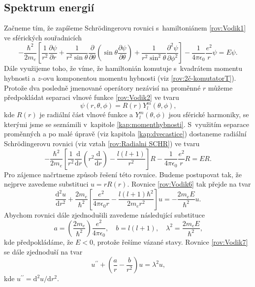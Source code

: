 \subsection{Spektrum energií}
\label{kap:SpektrumEnergii}

Začneme tím, že zapíšeme Schrödingerovu rovnici s~hamiltoniánem \eqref{rov:Vodik1} ve sférických souřadnicích
\begin{equation}
-\frac{\hbar^2}{2m_e} \left[ \frac{1}{r^2}\frac{\partial \psi}{\partial r} + \frac{1}{r^2 \sin \theta}\frac{\partial}{\partial \theta} \left( \sin \theta \frac{\partial \psi}{\partial \theta} \right) + \frac{1}{r^2 \sin^2 \theta}\frac{\partial^2 \psi}{\partial \phi^2}\right] - \frac{1}{4 \pi \epsilon_0}\frac{e^2}{r}\psi = E \psi \mbox{.}
\label{rov:Vodik4}
\end{equation}
Dále využijeme toho, že víme, že hamiltonián komutuje s~kvadrátem momentu hybnosti a $z$-ovu komponentou momentu hybnosti (viz \eqref{rov:2č-komutatorT}). Protože dva posledně jmenované operátory nezávisí na proměnné $r$ můžeme předpokládat separaci vlnové funkce \eqref{rov:Vodik2} ve tvaru
\begin{equation}
\psi(r, \theta, \phi) = R(r)Y_l^m(\theta, \phi) \mbox{,}
\label{rov:Vodik5}
\end{equation}
kde $R(r)$ je radiální část vlnové funkce a $Y_l^m(\theta, \phi)$ jsou sférické harmoniky, se kterými jsme se seznámili v~kapitole \ref{kap:momenthybnosti}. S~využitím separace proměnných a po malé úpravě (viz kapitola \ref{kap:dvecastice}) dostaneme radiální Schrödingerovu rovnici (viz vztah \eqref{rov:Radialni SCHR}) ve tvaru
\begin{equation}
-\frac{\hbar^2}{2m_e} \left[ \frac{1}{r^2}\frac{\mathrm{d}}{\mathrm{d} r} \left( r^2  \frac{\mathrm{d}}{\mathrm{d}r} \right) - \frac{l(l+1)}{r^2}\right]R - \frac{1}{4 \pi \epsilon_0}\frac{e^2}{r}R = E R \mbox{.}
\label{rov:Vodik6}
\end{equation}
Pro zájemce načrtneme způsob řešení této rovnice. Budeme postupovat tak, že nejprve zavedeme substituci $u=rR(r)$. Rovnice \eqref{rov:Vodik6} tak přejde na tvar
\begin{equation}
\frac{\mathrm{d}^2 u}{\mathrm{d}r^2}+ \frac{2m_e}{\hbar^2}\left[ \frac{e^2}{4 \pi \epsilon_0 r} - \frac{l(l+1)\hbar^2}{2 m_e r^2}\right]u = -\frac{2m_e E}{\hbar^2}u \mbox{.}
\label{rov:Vodik7}
\end{equation} 
Abychom rovnici dále zjednodušili zavedeme následující substituce
\begin{equation}
a = \left(\frac{2m_e}{\hbar^2} \right) \frac{e^2}{4\pi \epsilon_0}, \quad b=l(l+1), \quad \lambda^2 = \frac{2 m_e E}{\hbar^2} \mbox{,}
\label{rov:Vodik8}
\end{equation}
kde předpokládáme, že $E<0$, protože řešíme vázané stavy. Rovnice \eqref{rov:Vodik7} se dále zjednoduší na tvar
\begin{equation}
u^{\prime\prime} + \left( \frac{a}{r} - \frac{b}{r^2} \right) u = \lambda^2 u \mbox{,}
\label{rov:Vodik9}
\end{equation}
kde $u^{\prime\prime} = \mathrm{d}^2u/\mathrm{d}r^2$.

